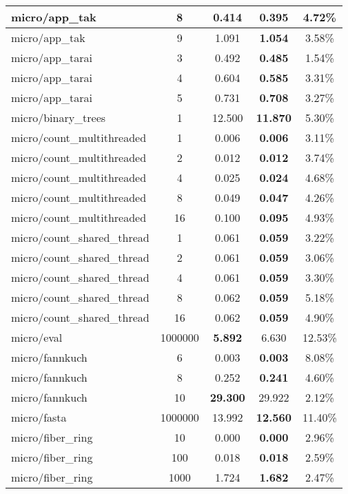 \begin{center}
\begin{longtable}{l|c|c|c|c}
  micro/app\_tak & 8 & 0.414 & \textbf{0.395} & 4.72\% \\ \hline
  micro/app\_tak & 9 & 1.091 & \textbf{1.054} & 3.58\% \\ \hline
  micro/app\_tarai & 3 & 0.492 & \textbf{0.485} & 1.54\% \\ \hline
  micro/app\_tarai & 4 & 0.604 & \textbf{0.585} & 3.31\% \\ \hline
  micro/app\_tarai & 5 & 0.731 & \textbf{0.708} & 3.27\% \\ \hline
  micro/binary\_trees & 1 & 12.500 & \textbf{11.870} & 5.30\% \\ \hline
  micro/count\_multithreaded & 1 & 0.006 & \textbf{0.006} & 3.11\% \\ \hline
  micro/count\_multithreaded & 2 & 0.012 & \textbf{0.012} & 3.74\% \\ \hline
  micro/count\_multithreaded & 4 & 0.025 & \textbf{0.024} & 4.68\% \\ \hline
  micro/count\_multithreaded & 8 & 0.049 & \textbf{0.047} & 4.26\% \\ \hline
  micro/count\_multithreaded & 16 & 0.100 & \textbf{0.095} & 4.93\% \\ \hline
  micro/count\_shared\_thread & 1 & 0.061 & \textbf{0.059} & 3.22\% \\ \hline
  micro/count\_shared\_thread & 2 & 0.061 & \textbf{0.059} & 3.06\% \\ \hline
  micro/count\_shared\_thread & 4 & 0.061 & \textbf{0.059} & 3.30\% \\ \hline
  micro/count\_shared\_thread & 8 & 0.062 & \textbf{0.059} & 5.18\% \\ \hline
  micro/count\_shared\_thread & 16 & 0.062 & \textbf{0.059} & 4.90\% \\ \hline
  micro/eval & 1000000 & \textbf{5.892} & 6.630 & 12.53\% \\ \hline
  micro/fannkuch & 6 & 0.003 & \textbf{0.003} & 8.08\% \\ \hline
  micro/fannkuch & 8 & 0.252 & \textbf{0.241} & 4.60\% \\ \hline
  micro/fannkuch & 10 & \textbf{29.300} & 29.922 & 2.12\% \\ \hline
  micro/fasta & 1000000 & 13.992 & \textbf{12.560} & 11.40\% \\ \hline
  micro/fiber\_ring & 10 & 0.000 & \textbf{0.000} & 2.96\% \\ \hline
  micro/fiber\_ring & 100 & 0.018 & \textbf{0.018} & 2.59\% \\ \hline
  micro/fiber\_ring & 1000 & 1.724 & \textbf{1.682} & 2.47\% \\ \hline

\end{longtable}
\end{center}
